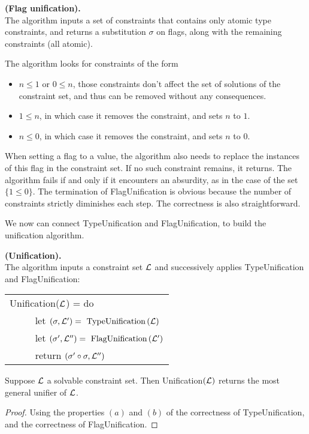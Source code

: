 \begin{algorithm}{\bf (Flag unification).} \\
	The algorithm inputs a set of constraints that contains only atomic type constraints, and returns a substitution
	$\sigma$ on flags, along with the remaining constraints (all atomic).
	
	The algorithm looks for constraints of the form
	\begin{itemize}
		\item $n \le 1$ or $0 \le n$, those constraints don't affect the set of solutions of the constraint set, and thus can be removed
			without any consequences.
		\item $1 \le n$, in which case it removes the constraint, and sets $n$ to $1$.
		\item $n \le 0$, in which case it removes the constraint, and sets $n$ to $0$.
	\end{itemize}	
	When setting a flag to a value, the algorithm also needs to replace the instances of this flag in the constraint set.
	If no such constraint remains, it returns. The algorithm fails if and only if it encounters an absurdity,
	as in the case of the set $\{ 1 \le 0 \}$.
	The termination of FlagUnification is obvious because the number of constraints strictly diminishes each step.
	The correctness is also straightforward.
\end{algorithm}

We now can connect TypeUnification and FlagUnification, to build the unification algorithm.

\begin{defn} {\bf (Unification).} \\
	The algorithm inputs a constraint set $\mathcal{L}$ and successively applies TypeUnification and FlagUnification:
		\begin{center}
		\begin{tabular}{l}
			Unification($\mathcal{L}$) = do \\
			~~ ~~ let $(\sigma, \mathcal{L}') = \text{ TypeUnification} \,(\mathcal{L})$ \\
			~~ ~~ let $(\sigma', \mathcal{L}'') = \text{ FlagUnification} \,(\mathcal{L}')$ \\
			~~ ~~ return $(\sigma' \circ \sigma, \mathcal{L}'')$
		\end{tabular}
		\end{center}
\end{defn}

\begin{lemma} Suppose $\mathcal{L}$ a solvable constraint set. Then Unification$(\mathcal{L})$ returns the most general unifier of $\mathcal{L}$.
	\begin{proof}
		Using the properties $(a)$ and $(b)$ of the correctness of TypeUnification, and the correctness of FlagUnification.
	\end{proof}
\end{lemma}

